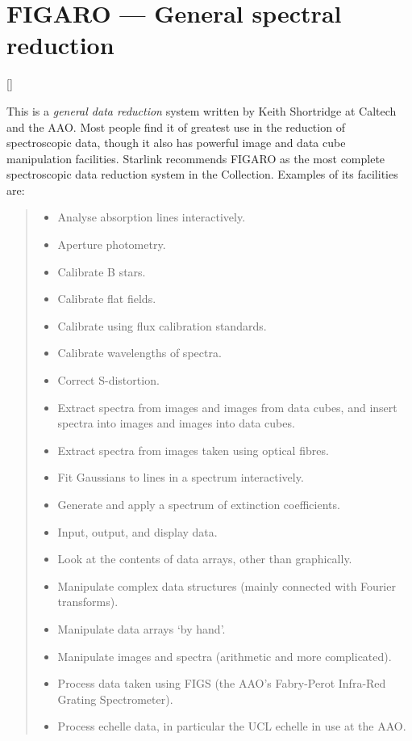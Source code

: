 \newpage

\section{FIGARO --- General spectral reduction} 

\vspace{-11mm}

\hfill []

\vspace{5mm}

This is a {\em general data reduction} system written by Keith Shortridge at
Caltech and the AAO.
Most people find it of greatest use in the reduction of spectroscopic data,
though it also has powerful image and data cube manipulation facilities.
Starlink recommends FIGARO as the most complete spectroscopic data reduction
system in the Collection.
Examples of its facilities are:

{\small
\begin{quote}
\begin{itemize}
\item Analyse absorption lines interactively.
\item Aperture photometry.
\item Calibrate B stars.
\item Calibrate flat fields.
\item Calibrate using flux calibration standards.
\item Calibrate wavelengths of spectra.
\item Correct S-distortion.
\item Extract spectra from images and images from data cubes, and insert
 spectra into images and images into data cubes.
\item Extract spectra from images taken using optical fibres.
\item Fit Gaussians to lines in a spectrum interactively.
\item Generate and apply a spectrum of extinction coefficients.
\item Input, output, and display data.
\item Look at the contents of data arrays, other than graphically.
\item Manipulate complex data structures (mainly connected with Fourier
 transforms).
\item Manipulate data arrays `by hand'.
\item Manipulate images and spectra (arithmetic and more complicated).
\item Process data taken using FIGS (the AAO's Fabry-Perot Infra-Red Grating
Spectrometer).
\item Process echelle data, in particular the UCL echelle in use at the AAO.
\end{itemize}
\end{quote}
}

